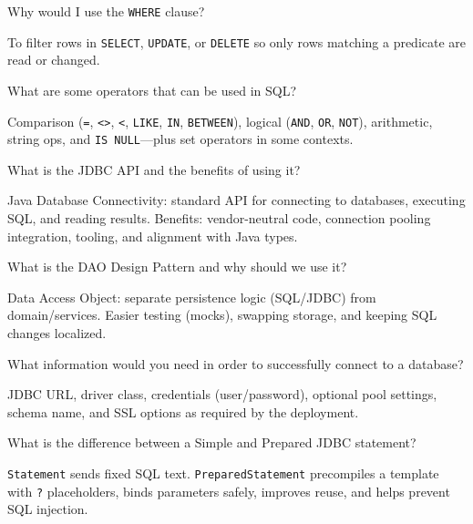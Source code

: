 \question[4]
Why would I use the \texttt{WHERE} clause?
\begin{solutionorbox}[1.05in]
  To filter rows in \texttt{SELECT}, \texttt{UPDATE}, or \texttt{DELETE} so only rows matching a predicate are read or changed.
\end{solutionorbox}

\question[4]
What are some operators that can be used in SQL?
\begin{solutionorbox}[1.35in]
  Comparison (\texttt{=}, \texttt{<>}, \texttt{<}, \texttt{LIKE}, \texttt{IN}, \texttt{BETWEEN}), logical (\texttt{AND}, \texttt{OR}, \texttt{NOT}), arithmetic, string ops, and \texttt{IS NULL}---plus set operators in some contexts.
\end{solutionorbox}

\newpage


\question[4]
What is the JDBC API and the benefits of using it?
\begin{solutionorbox}[1.35in]
  Java Database Connectivity: standard API for connecting to databases, executing SQL, and reading results. Benefits: vendor-neutral code, connection pooling integration, tooling, and alignment with Java types.
\end{solutionorbox}

\question[4]
What is the DAO Design Pattern and why should we use it?
\begin{solutionorbox}[1.35in]
  Data Access Object: separate persistence logic (SQL/JDBC) from domain/services. Easier testing (mocks), swapping storage, and keeping SQL changes localized.
\end{solutionorbox}

\question[4]
What information would you need in order to successfully connect to a database?
\begin{solutionorbox}[1.35in]
  JDBC URL, driver class, credentials (user/password), optional pool settings, schema name, and SSL options as required by the deployment.
\end{solutionorbox}

\question[4]
What is the difference between a Simple and Prepared JDBC statement?
\begin{solutionorbox}[1.35in]
  \texttt{Statement} sends fixed SQL text. \texttt{PreparedStatement} precompiles a template with \texttt{?} placeholders, binds parameters safely, improves reuse, and helps prevent SQL injection.
\end{solutionorbox}

